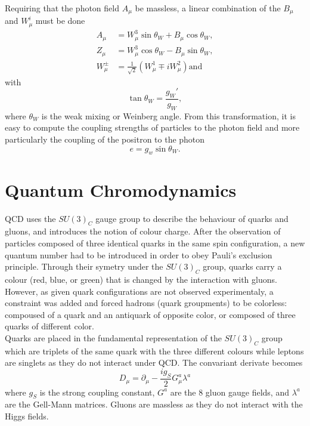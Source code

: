     Requiring that the photon field $ A_\mu $ be massless, a linear combination of the $ B_\mu $ and $ W^i_\mu $ must be done
    \begin{align}
      A_\mu & = W^3_\mu \sin \theta_W + B_\mu \cos \theta_W , \\
      Z_\mu & = W^3_\mu \cos \theta_W - B_\mu \sin \theta_W , \\
      W^\pm_\mu & = \frac{1}{\sqrt{2}} \left( W^1_\mu \mp i W^2_\mu \right) \text{and}
    \end{align}
    with
    \begin{equation}
      \tan \theta_W = \frac{g_W'}{g_W} ,
    \end{equation}
    where $ \theta_W $ is the weak mixing or Weinberg angle. From this transformation, it is easy to compute the coupling strengths of particles to the photon field and more particularly the coupling of the positron to the photon
    \begin{equation}
      e = g_w \sin \theta_W .
    \end{equation}

  \section{Quantum Chromodynamics}

    QCD uses the $ SU(3)_C $ gauge group to describe the behaviour of quarks and gluons, and introduces the notion of colour charge. After the observation of particles composed of three identical quarks in the same spin configuration, a new quantum number had to be introduced in order to obey Pauli's exclusion principle. Through their symetry under the $ SU(3)_C $ group, quarks carry a colour (red, blue, or green) that is changed by the interaction with gluons. However, as given quark configurations are not observed experimentaly, a constraint was added and forced hadrons (quark groupments) to be colorless: compoused of a quark and an antiquark of opposite color, or composed of three quarks of different color. \\

    Quarks are placed in the fundamental representation of the $ SU(3)_C $ group which are triplets of the same quark with the three different colours while leptons are singlets as they do not interact under QCD. The convariant derivate becomes
    \begin{equation}
      D_\mu = \partial_\mu - \frac{i g_S}{2} G^a_\mu \lambda^a
    \end{equation}
    where $ g_S $ is the strong coupling constant, $ G^a $ are the 8 gluon gauge fields, and $ \lambda^a $ are the Gell-Mann matrices. Gluons are massless as they do not interact with the Higgs fields.

